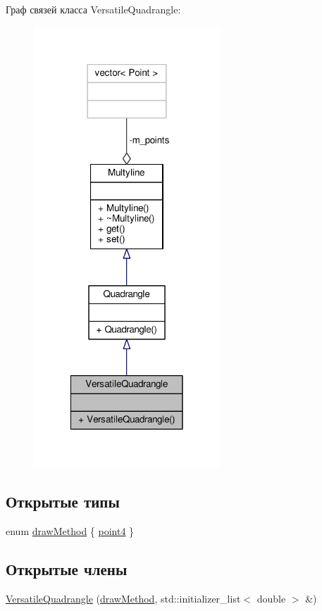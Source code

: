 Граф связей класса Versatile\-Quadrangle\-:
\nopagebreak
\begin{figure}[H]
\begin{center}
\leavevmode
\includegraphics[width=198pt]{class_versatile_quadrangle__coll__graph}
\end{center}
\end{figure}
\subsection*{Открытые типы}
\begin{DoxyCompactItemize}
\item 
enum \hyperlink{class_versatile_quadrangle_aa897c08c7c9faf1813e7df4194a71e37}{draw\-Method} \{ \hyperlink{class_versatile_quadrangle_aa897c08c7c9faf1813e7df4194a71e37aaae92cad588cdacc57f810f244da32e0}{point4}
 \}
\end{DoxyCompactItemize}
\subsection*{Открытые члены}
\begin{DoxyCompactItemize}
\item 
\hyperlink{class_versatile_quadrangle_a5740f0b17fdca9d9de0dfe52e58412ea}{Versatile\-Quadrangle} (\hyperlink{class_multyline_ad75d7bb224267d0d7b4c40fd72a1d920}{draw\-Method}, std\-::initializer\-\_\-list$<$ double $>$ \&)
\end{DoxyCompactItemize}


